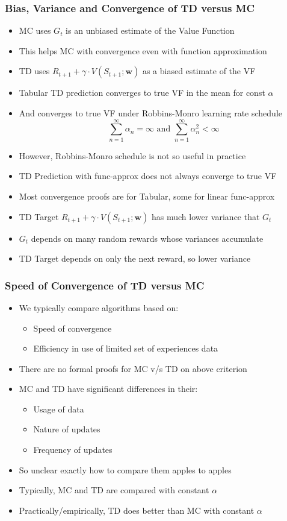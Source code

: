 \documentclass[handout]{beamer}
\begin{document}
\begin{frame}
\frametitle{Bias, Variance and Convergence of TD versus MC}
\pause
\begin{itemize}[<+->]
\item MC uses $G_t$ is an unbiased estimate of the Value Function
\item This helps MC with convergence even with function approximation
\item TD uses $R_{t+1} + \gamma \cdot V(S_{t+1};\bm{w})$ as a biased estimate of the VF
\item Tabular TD prediction converges to true VF in the mean for const $\alpha$
\item And converges to true VF under Robbins-Monro learning rate schedule
$$\sum_{n=1}^{\infty} \alpha_n = \infty \text{ and } \sum_{n=1}^{\infty} \alpha_n^2 < \infty$$
\item However, Robbins-Monro schedule is not so useful in practice
\item TD Prediction with func-approx does not always converge to true VF
\item Most convergence proofs are for Tabular, some for linear func-approx
\item TD Target $R_{t+1} + \gamma \cdot V(S_{t+1}; \bm{w})$ has much lower variance that $G_t$
\item $G_t$ depends on many random rewards whose variances accumulate
\item TD Target depends on only the next reward, so lower variance
\end{itemize}
\end{frame}

\begin{frame}
\frametitle{Speed of Convergence of TD versus MC}
\pause
\begin{itemize}[<+->]
\item We typically compare algorithms based on:
\begin{itemize}[<+->]
\item Speed of convergence
\item Efficiency in use of limited set of experiences data
\end{itemize}
\item There are no formal proofs for MC v/s TD on above criterion
\item MC and TD have significant differences in their:
\begin{itemize}[<+->]
\item Usage of data
\item Nature of updates
\item Frequency of updates
\end{itemize}
\item So unclear exactly how to compare them apples to apples
\item Typically, MC and TD are compared with constant $\alpha$
\item Practically/empirically, TD does better than MC with constant $\alpha$
\end{itemize}
\end{frame}
\end{document}
